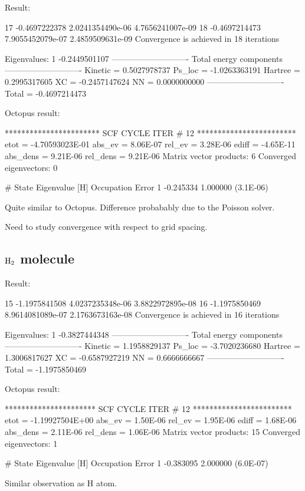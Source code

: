 Result:
\begin{textcode}
  17      -0.4697222378   2.0241354490e-06   4.7656241007e-09
  18      -0.4697214473   7.9055452079e-07   2.4859509631e-09
Convergence is achieved in 18 iterations

Eigenvalues:
 1      -0.2449501107
----------------------------
Total energy components
----------------------------
Kinetic =       0.5027978737
Ps_loc  =      -1.0263363191
Hartree =       0.2995317605
XC      =      -0.2457147624
NN      =       0.0000000000
----------------------------
Total   =      -0.4697214473
\end{textcode}

Octopus result:
\begin{textcode}
*********************** SCF CYCLE ITER #   12 ************************
 etot  = -4.70593023E-01 abs_ev   =  8.06E-07 rel_ev   =  3.28E-06
 ediff =       -4.65E-11 abs_dens =  9.21E-06 rel_dens =  9.21E-06
Matrix vector products:      6
Converged eigenvectors:      0
 
 #  State  Eigenvalue [H]  Occupation    Error
       1       -0.245334    1.000000   (3.1E-06)
\end{textcode}

Quite similar to Octopus.
Difference probabably due to the Poisson solver.

Need to study convergence with respect to grid spacing.

\subsection{$\ce{H2}$ molecule}

Result:
\begin{textcode}
  15      -1.1975841508   4.0237235348e-06   3.8822972895e-08
  16      -1.1975850469   8.9614081089e-07   2.1763673163e-08
Convergence is achieved in 16 iterations

Eigenvalues:
 1      -0.3827444348
----------------------------
Total energy components
----------------------------
Kinetic =       1.1958829137
Ps_loc  =      -3.7020236680
Hartree =       1.3006817627
XC      =      -0.6587927219
NN      =       0.6666666667
----------------------------
Total   =      -1.1975850469
\end{textcode}

Octopus result:
\begin{textcode}
********************** SCF CYCLE ITER #   12 ************************
 etot  = -1.19927504E+00 abs_ev   =  1.50E-06 rel_ev   =  1.95E-06
 ediff =        1.68E-06 abs_dens =  2.11E-06 rel_dens =  1.06E-06
Matrix vector products:     15
Converged eigenvectors:      1

#  State  Eigenvalue [H]  Occupation    Error
      1       -0.383095    2.000000   (6.0E-07) 
\end{textcode}

Similar observation as H atom.